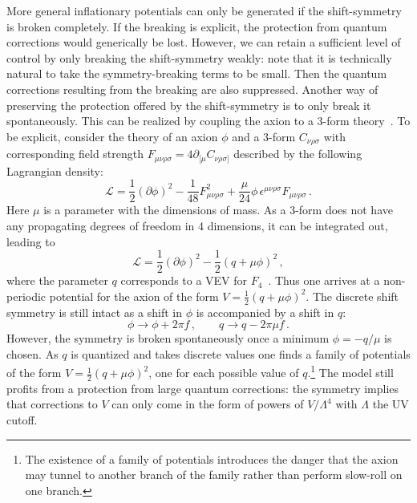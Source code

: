 More general inflationary potentials can only be generated if the shift-symmetry is broken completely. If the breaking is explicit, the protection from quantum corrections would generically be lost. However, we can retain a sufficient level of control by only breaking the shift-symmetry weakly: note that it is technically natural to take the symmetry-breaking terms  to be small. Then the quantum corrections resulting from the breaking are also suppressed. Another way of preserving the protection offered by the shift-symmetry is to only break it spontaneously. This can be realized by coupling the axion to a 3-form theory~\cite{0507215, 0811.1989, 1101.0026}. To be explicit, consider the theory of an axion $\phi$ and a 3-form $C_{\nu \rho \sigma}$ with corresponding field strength $F_{\mu \nu \rho \sigma} = 4 \partial_{[ \mu} C_{\nu \rho \sigma]}$ described by the following Lagrangian density:
\begin{equation}
\mathcal{L} = \frac{1}{2} (\partial \phi)^2 - \frac{1}{48} F_{\mu \nu \rho \sigma}^2 + \frac{\mu}{24} \phi \, \epsilon^{\mu \nu \rho \sigma} F_{\mu \nu \rho \sigma} \, .
\end{equation}
Here $\mu$ is a parameter with the dimensions of mass. As a 3-form does not have any propagating degrees of freedom in 4 dimensions, it can be integrated out, leading to
\begin{equation}
\mathcal{L} = \frac{1}{2} (\partial \phi)^2 - \frac{1}{2} (q+\mu \phi)^2 \, ,
\end{equation}
where the parameter $q$ corresponds to a VEV for $F_4$~\cite{0811.1989}. Thus one arrives at a non-periodic potential for the axion of the form $V= \tfrac{1}{2}(q+\mu \phi)^2$. The discrete shift symmetry is still intact as a shift in $\phi$ is accompanied by a shift in $q$:
\begin{equation}
\phi \rightarrow \phi + 2 \pi f \, , \qquad q \rightarrow q - 2 \pi \mu f \, .
\end{equation}
However, the symmetry is broken spontaneously once a minimum $\phi = - q / \mu$ is chosen. As $q$ is quantized and takes discrete values one finds a family of potentials of the form $V= \tfrac{1}{2}(q+\mu \phi)^2$, one for each possible value of $q$.\footnote{The existence of a family of potentials introduces the danger that the axion may tunnel to another branch of the family rather than perform slow-roll on one branch.} The model still profits from a protection from large quantum corrections: the symmetry implies that corrections to $V$ can only come in the form of powers of $V/\Lambda^4$ with $\Lambda$ the UV cutoff.   

